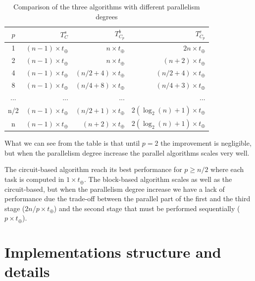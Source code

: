 \documentclass{article}
\begin{document}
\begin{table}[h]
\centering
\begin{tabular}{|c|r|r|r|}
\hline
 $p$ & $T^s_{C}$                & $T^b_{C_p}$                   & $T^c_{C_p}$ \\ \hline
  1  & $(n-1)\times t_{\oplus}$ & $n \times t_{\oplus}$         & $2n \times t_{\oplus}$\\ \hline
  2  & $(n-1)\times t_{\oplus}$ & $n \times t_{\oplus}$         & $(n+2) \times t_{\oplus}$ \\ \hline
  4  & $(n-1)\times t_{\oplus}$ & $(n/2 + 4) \times t_{\oplus}$ & $(n/2+4) \times t_{\oplus}$ \\ \hline
  8  & $(n-1)\times t_{\oplus}$ & $(n/4 + 8) \times t_{\oplus}$ & $(n/4+3) \times t_{\oplus}$ \\ \hline
 ... & ...                      & ...                           & ... \\ \hline
 n/2 & $(n-1)\times t_{\oplus}$ & $(n/2+1)\times t_{\oplus}$    & $2(\log_{2}(n) + 1) \times t_{\oplus}$ \\ \hline
  n  & $(n-1)\times t_{\oplus}$ & $(n+2)\times t_{\oplus}$      & $2(\log_{2}(n) + 1) \times t_{\oplus}$ \\ \hline
\end{tabular}
\caption{Comparison of the three algorithms with different parallelism degrees}
\end{table}

What we can see from the table is that until $p = 2$ the improvement is negligible, but when the parallelism degree increase the parallel algorithms scales very well.

\medskip

The circuit-based algorithm reach its best performance for $p \geq n/2$ where each task is computed in $1 \times t_{\oplus}$. 
The block-based algorithm scales as well as the circuit-based, but when the parallelism degree increase we have a lack of performance due the trade-off between the parallel part of the first and the third stage ($2n/p \times t_{\oplus}$) and the second stage that must be performed sequentially ($p \times t_{\oplus}$).


\section{Implementations structure and details}
\end{document}
